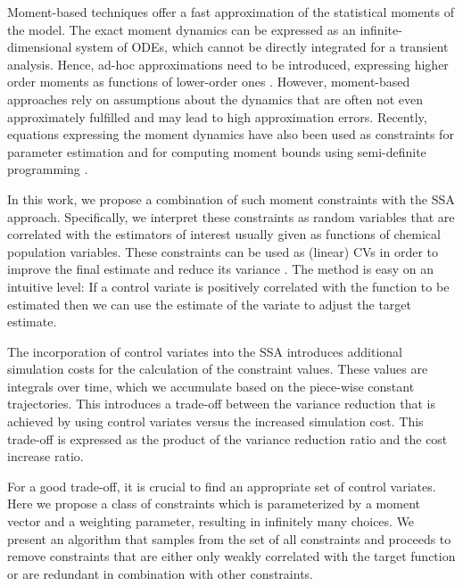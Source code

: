 Moment-based techniques offer a fast approximation of the statistical moments of the model. 
The exact moment dynamics can be expressed as an infinite-dimensional system of \acp{ODE}, which cannot be directly  integrated for a transient analysis.
Hence, ad-hoc approximations need to be introduced, expressing higher order moments as functions of lower-order ones \parencite{ale2013general,engblom2006computing}.
However, moment-based approaches rely on assumptions about the dynamics that are
often not even approximately fulfilled and may lead to high approximation errors. 
Recently, equations expressing the moment dynamics have also been used as constraints for parameter
estimation \parencite{backenkohler2018moment} and for computing moment bounds using semi-definite programming \parencite{dowdy2018dynamic,ghusinga2017exact}.

In this work, we propose a combination of such moment constraints with the \ac{SSA} approach.
Specifically, we   interpret these constraints as random variables 
that are correlated with the estimators of interest usually given as functions of chemical population variables.
These constraints can be used  as  (linear) \acfp{CV} in order to improve the final estimate and reduce its variance \parencite{lavenberg1982statistical,szechtman2003control}.
The method is easy on an intuitive level: If a control variate
is positively correlated with the function to be estimated then 
we can use the estimate of the variate to
adjust the target estimate.

The incorporation of control variates into the \ac{SSA}
introduces   additional simulation costs for the calculation of the constraint values.
These values are integrals over time, which we accumulate  based on the
piece-wise constant trajectories.
This introduces a trade-off between the variance reduction that is achieved
by using control variates versus the increased simulation cost.
This trade-off is expressed as the product of the variance reduction ratio
and the cost increase ratio.

For a good trade-off, it is crucial to find an appropriate set of control variates.
Here we propose a class of constraints which is parameterized by a moment vector
and a weighting parameter, resulting in infinitely many choices.
We present an algorithm that samples from the set of all constraints and
proceeds to remove constraints that are either only weakly correlated with the
target function or are redundant in combination with other constraints.

